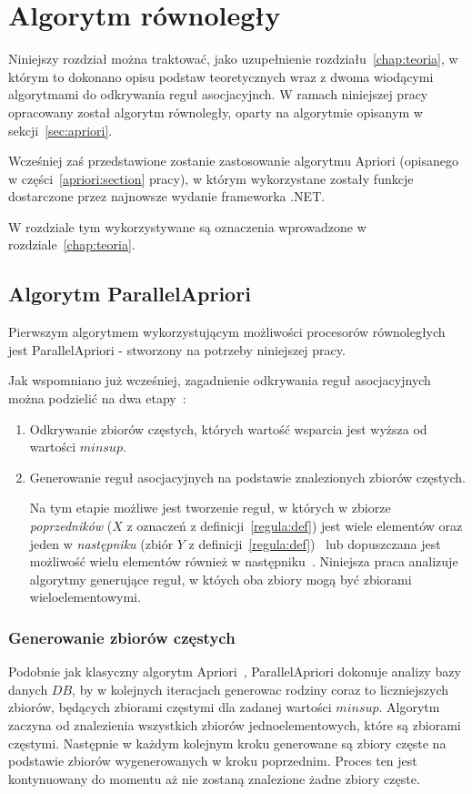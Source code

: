 \chapter{Algorytm równoległy\label{chap:algorytm}}

Niniejszy rozdział można traktować, jako uzupełnienie rozdziału~\ref{chap:teoria}, w którym to dokonano opisu podstaw teoretycznych wraz z dwoma wiodącymi algorytmami do odkrywania reguł asocjacyjnch. W ramach niniejszej pracy opracowany został algorytm równoległy, oparty na algorytmie opisanym w sekcji~\ref{sec:apriori}.

Wcześniej zaś przedstawione zostanie zastosowanie algorytmu Apriori (opisanego w części~\ref{apriori:section} pracy), w którym wykorzystane zostały funkcje dostarczone przez najnowsze wydanie frameworka .NET. 

W rozdziale tym wykorzystywane są oznaczenia wprowadzone w rozdziale~\ref{chap:teoria}.

\section{Algorytm ParallelApriori\label{sec:papriori}}
Pierwszym algorytmem wykorzystującym możliwości procesorów równoległych jest ParallelApriori - stworzony na potrzeby niniejszej pracy. 

Jak wspomniano już wcześniej, zagadnienie odkrywania reguł asocjacyjnych można podzielić na dwa etapy~\cite{Problem:Statement}:
\begin{enumerate}
	\item Odkrywanie zbiorów częstych, których wartość wsparcia jest wyższa od wartości $minsup$.
	\item Generowanie reguł asocjacyjnych na podstawie znalezionych zbiorów częstych.

	Na tym etapie możliwe jest tworzenie reguł, w których w zbiorze \emph{poprzedników} ($X$ z oznaczeń z definicji~\ref{regula:def}) jest wiele elementów oraz jeden w \emph{następniku} (zbiór $Y$ z definicji~\ref{regula:def})~\cite{Problem:Statement} lub dopuszczana jest możliwość wielu elementów również w następniku~\cite{Apriori:Main}. Niniejsza praca analizuje algorytmy generujące reguł, w któych oba zbiory mogą być zbiorami wieloelementowymi.
\end{enumerate}

\subsection{Generowanie zbiorów częstych}\label{papriori:gen}
Podobnie jak klasyczny algorytm Apriori~\cite{Apriori:Main}, ParallelApriori dokonuje analizy bazy danych $DB$, by w kolejnych iteracjach generowac rodziny coraz to liczniejszych zbiorów, będących zbiorami częstymi dla zadanej wartości $minsup$. Algorytm zaczyna od znalezienia wszystkich zbiorów jednoelementowych, które są zbiorami częstymi. Następnie w każdym kolejnym kroku generowane są zbiory częste na podstawie zbiorów wygenerowanych w kroku poprzednim. Proces ten jest kontynuowany do momentu aż nie zostaną znalezione żadne zbiory częste.

